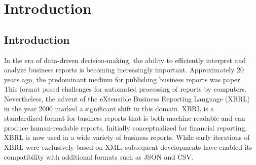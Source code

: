 \chapter{Introduction}
\label{sec:introduction}

\section{Introduction}


In the era of data-driven decision-making, the ability to efficiently interpret and analyze business reports is becoming increasingly important.
Approximately 20 years ago,
the predominant medium for publishing business reports was paper.
This format posed challenges for automated processing of reports by computers. 
Nevertheless,
the advent of the eXtensible Business Reporting Language (XBRL) in the year 2000 marked a significant shift in this domain\cite{aicpa_xbrl_story}.
XBRL is a standardized format for business reports that is both machine-readable and can produce human-readable reports.
Initially conceptualized for financial reporting,
XBRL is now used in a wide variety of business reports\cite{xbrl_about}.
While early iterations of XBRL were exclusively based on XML, 
subsequent developments have enabled its compatibility with additional formats such as JSON and CSV.

